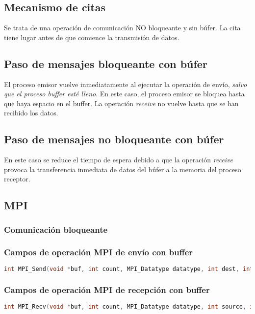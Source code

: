 \documentclass[a4paper,12pt]{article}
\begin{document}
\subsection{Mecanismo de citas}

Se trata de una operación de comunicación NO bloqueante y sin búfer. La cita tiene lugar antes de que comience la transmisión de datos.

\subsection{Paso de mensajes bloqueante con búfer}

El proceso emisor vuelve inmediatamente al ejecutar la operación de envío, \textit{salvo que el proceso buffer esté lleno}. En este caso, el proceso emisor se bloquea hasta que haya espacio en el buffer. La operación \textit{receive} no vuelve hasta que se han recibido los datos.

\subsection{Paso de mensajes no bloqueante con búfer}

En este caso se reduce el tiempo de espera debido a que la operación \textit{receive} provoca la transferencia inmediata de datos del búfer a la memoria del proceso receptor.

\subsection{MPI}
\subsubsection{Comunicación bloqueante}
\subsubsection*{Campos de operación MPI de envío con buffer}
\begin{lstlisting}[language=c++]
int MPI_Send(void *buf, int count, MPI_Datatype datatype, int dest, int tag, MPI_Comm comm);
\end{lstlisting}
\subsubsection*{Campos de operación MPI de recepción con buffer}
\begin{lstlisting}[language=c++]
int MPI_Recv(void *buf, int count, MPI_Datatype datatype, int source, int tag, MPI_Comm comm, MPI_Status *status);
\end{lstlisting}
\end{document}
